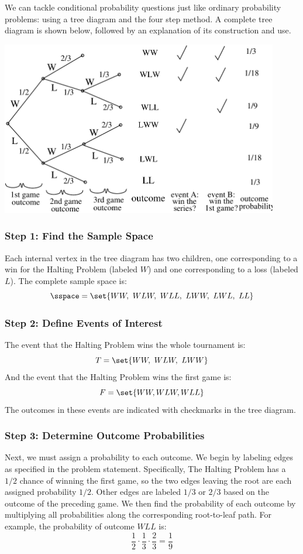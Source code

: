 We can tackle conditional probability questions just like ordinary
probability problems: using a tree diagram and the four step method.
A complete tree diagram is shown below, followed by an explanation of
its construction and use.
%
\begin{center}
\includegraphics[height=3in]{figures/hockey} %
\end{center}

\subsubsection*{Step 1:  Find the Sample Space}

Each internal vertex in the tree diagram has two children, one
corresponding to a win for the Halting Problem (labeled $W$) and one
corresponding to a loss (labeled $L$).  The complete sample space is:
%
\[
\sspace = \set{ WW,\ WLW,\ WLL,\ LWW,\ LWL,\ LL }
\]

\subsubsection*{Step 2:  Define Events of Interest}

The event that the Halting Problem wins the whole tournament is:
%
\[
T = \set{WW,\ WLW,\ LWW} \\
\]
%
And the event that the Halting Problem wins the first game is:
%
\[
F = \set{WW, WLW, WLL }
\]
%
The outcomes in these events are indicated with checkmarks in the tree
diagram.

\subsubsection*{Step 3:  Determine Outcome Probabilities}

Next, we must assign a probability to each outcome.  We begin by
labeling edges as specified in the problem statement.  Specifically,
The Halting Problem has a $1/2$ chance of winning the first game, so
the two edges leaving the root are each assigned probability $1/2$.
Other edges are labeled $1/3$ or $2/3$ based on the outcome of the
preceding game.  We then find the probability of each outcome by
multiplying all probabilities along the corresponding root-to-leaf
path.  For example, the probability of outcome $WLL$ is:
%
\[
\frac{1}{2} \cdot \frac{1}{3} \cdot \frac{2}{3} = \frac{1}{9}
\]

